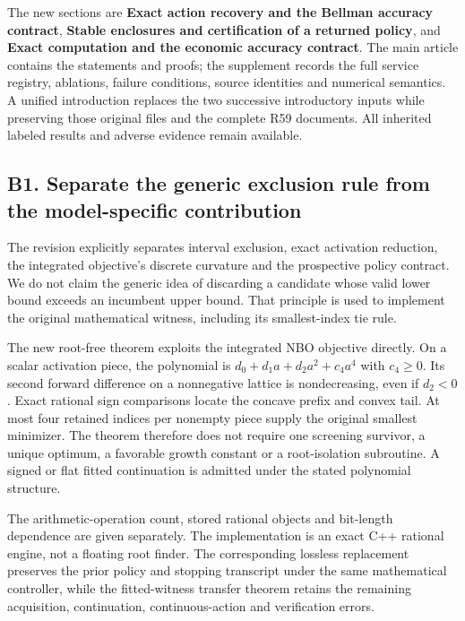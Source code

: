 \documentclass[ecta,nameyear,draft]{econsocart}
\begin{document}
The new sections are \textbf{Exact action recovery and the Bellman
accuracy contract}, \textbf{Stable enclosures and certification of a
returned policy}, and \textbf{Exact computation and the economic
accuracy contract}. The main article contains the statements and proofs;
the supplement records the full service registry, ablations, failure
conditions, source identities and numerical semantics. A unified
introduction replaces the two successive introductory inputs while
preserving those original files and the complete R59 documents. All
inherited labeled results and adverse evidence remain available.

\hypertarget{b1.-separate-the-generic-exclusion-rule-from-the-model-specific-contribution}{%
\subsection{B1. Separate the generic exclusion rule from the
model-specific
contribution}\label{b1.-separate-the-generic-exclusion-rule-from-the-model-specific-contribution}}

The revision explicitly separates interval exclusion, exact activation
reduction, the integrated objective's discrete curvature and the
prospective policy contract. We do not claim the generic idea of
discarding a candidate whose valid lower bound exceeds an incumbent
upper bound. That principle is used to implement the original
mathematical witness, including its smallest-index tie rule.

The new root-free theorem exploits the integrated NBO objective
directly. On a scalar activation piece, the polynomial is
\(d_0+d_1a+d_2a^2+c_4a^4\) with \(c_4\ge0\). Its second forward
difference on a nonnegative lattice is nondecreasing, even if \(d_2<0\).
Exact rational sign comparisons locate the concave prefix and convex
tail. At most four retained indices per nonempty piece supply the
original smallest minimizer. The theorem therefore does not require one
screening survivor, a unique optimum, a favorable growth constant or a
root-isolation subroutine. A signed or flat fitted continuation is
admitted under the stated polynomial structure.

The arithmetic-operation count, stored rational objects and bit-length
dependence are given separately. The implementation is an exact C++
rational engine, not a floating root finder. The corresponding lossless
replacement preserves the prior policy and stopping transcript under the
same mathematical controller, while the fitted-witness transfer theorem
retains the remaining acquisition, continuation, continuous-action and
verification errors.
\end{document}
